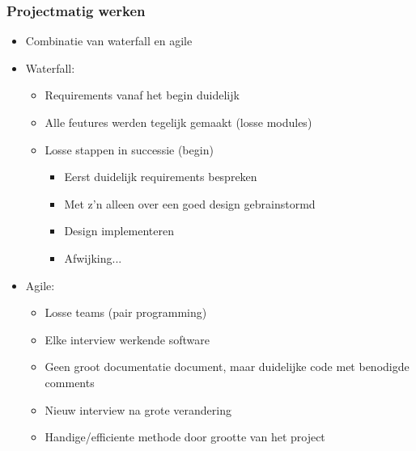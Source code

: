 \documentclass{beamer}
\begin{document}
\begin{frame}
\frametitle{Projectmatig werken}
    \begin{itemize}
        \item Combinatie van waterfall en agile
        
        \item Waterfall:
        \begin{itemize}
            \item Requirements vanaf het begin duidelijk
            \item Alle feutures werden tegelijk gemaakt (losse modules)
            \item Losse stappen in successie (begin)
            \begin{itemize}
                \item Eerst duidelijk requirements bespreken
                \item Met z'n alleen over een goed design gebrainstormd
                \item Design implementeren
                \item Afwijking...
            \end{itemize}
        \end{itemize}
        \vspace{+1mm}

        \item Agile:
        \begin{itemize}
            \item Losse teams (pair programming)
            \item Elke interview werkende software
            \item Geen groot documentatie document, maar duidelijke code met benodigde comments
            \item Nieuw interview na grote verandering
            \item Handige/efficiente methode door grootte van het project  %
        \end{itemize}
    \end{itemize}
\end{frame}
\end{document}
